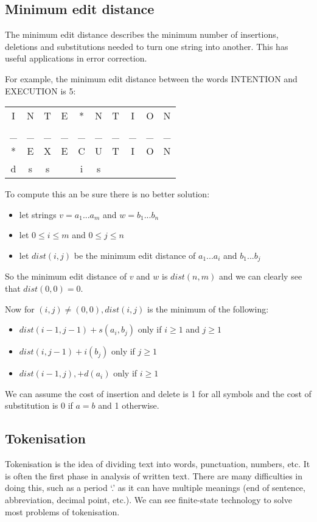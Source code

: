 \documentclass[Report.tex]{subfiles}
\begin{document}
\subsection{Minimum edit distance}
The minimum edit distance describes the minimum number of insertions,
deletions and substitutions needed to turn one string into another.
This has useful applications in error correction.

For example, the minimum edit distance between the words \textsc{INTENTION}
and \textsc{EXECUTION} is 5:
\begin{table}[H]
\centering
\begin{tabular}{c c c c c c c c c c}
I & N & T & E & * & N & T & I & O & N \\
\_ & \_ & \_ & \_ & \_ & \_ & \_ & \_ & \_ & \_ \\
* & E & X & E & C & U & T & I & O & N \\
d & s & s &   & i & s &   &   &   &   \\
\end{tabular}
\end{table}

To compute this an be sure there is no better solution:
\begin{itemize}
\item let strings $v = a_1 ... a_m$ and $w = b_1 ... b_n$
\item let $0 \leq i \leq m$ and $0 \leq j \leq n$
\item let $dist(i, j)$ be the minimum edit distance of $a_1 ... a_i$ 
and $b_1 ... b_j$
\end{itemize}
So the minimum edit distance of $v$ and $w$ is $dist(n, m)$ and we can
clearly see that $dist(0, 0) = 0$.

Now for $(i,j) \neq (0,0), dist(i, j)$ is the minimum of the following:
\begin{itemize}
\item $dist(i - 1, j - 1) + s(a_i, b_j)$ only if $i \geq 1$ and $j \geq 1$
\item $dist(i, j - 1) + i(b_j)$ only if $j \geq 1$
\item $dist(i - 1, j), + d(a_i)$ only if $i \geq 1$
\end{itemize}
We can assume the cost of insertion and delete is 1 for all symbols
and the cost of substitution is 0 if $a = b$ and 1 otherwise.


\subsection{Tokenisation}
Tokenisation is the idea of dividing text into words, punctuation, numbers, etc.
It is often the first phase in analysis of written text. There are many
difficulties in doing this, such as a period `.' as it can have multiple
meanings (end of sentence, abbreviation, decimal point, etc.). We can
see finite-state technology to solve most problems of tokenisation.
\end{document}
